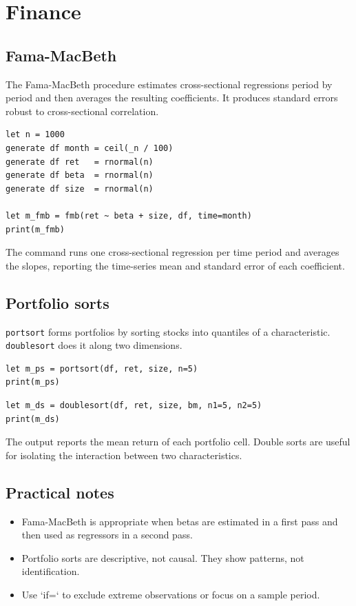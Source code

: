\chapter{Finance}

\section{Fama-MacBeth}

The Fama-MacBeth procedure estimates cross-sectional regressions period
by period and then averages the resulting coefficients. It produces
standard errors robust to cross-sectional correlation.

\begin{lstlisting}[caption={Fama-MacBeth regression}]
let n = 1000
generate df month = ceil(_n / 100)
generate df ret   = rnormal(n)
generate df beta  = rnormal(n)
generate df size  = rnormal(n)

let m_fmb = fmb(ret ~ beta + size, df, time=month)
print(m_fmb)
\end{lstlisting}

The command runs one cross-sectional regression per time period and
averages the slopes, reporting the time-series mean and standard error
of each coefficient.

\section{Portfolio sorts}

\texttt{portsort} forms portfolios by sorting stocks into quantiles of a
characteristic. \texttt{doublesort} does it along two dimensions.

\begin{lstlisting}[caption={Single portfolio sort}]
let m_ps = portsort(df, ret, size, n=5)
print(m_ps)
\end{lstlisting}

\begin{lstlisting}[caption={Double sort}]
let m_ds = doublesort(df, ret, size, bm, n1=5, n2=5)
print(m_ds)
\end{lstlisting}

The output reports the mean return of each portfolio cell. Double sorts
are useful for isolating the interaction between two characteristics.

\section{Practical notes}

\begin{itemize}
\item Fama-MacBeth is appropriate when betas are estimated in a first
      pass and then used as regressors in a second pass.
\item Portfolio sorts are descriptive, not causal. They show patterns,
      not identification.
\item Use `if=` to exclude extreme observations or focus on a sample
      period.
\end{itemize}
